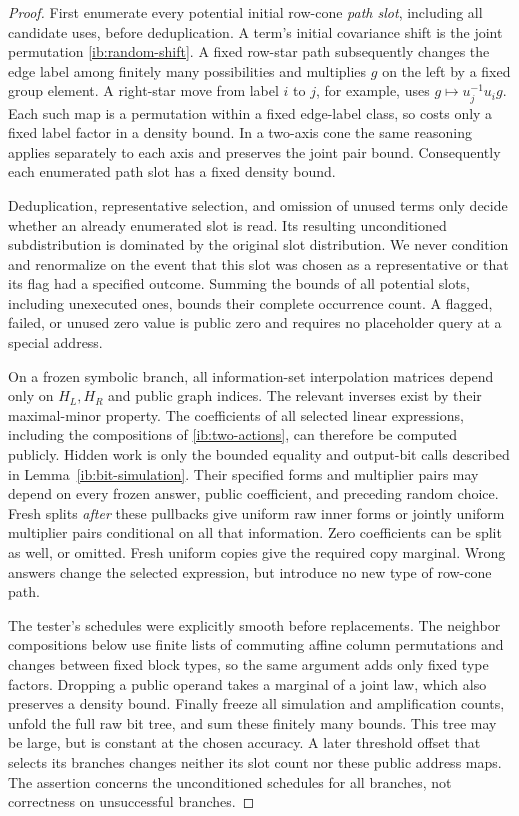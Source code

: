 \begin{proof}
First enumerate every potential initial row-cone \emph{path slot},
including all candidate uses, before deduplication.  A term's
initial covariance shift is the joint permutation
\eqref{ib:random-shift}.  A fixed row-star path subsequently changes
the edge label among finitely many possibilities and multiplies
\(g\) on the left by a fixed group element.  A right-star move
from label \(i\) to \(j\), for example, uses
\(g\mapsto u_j^{-1}u_i g\).  Each such map is a permutation
within a fixed edge-label class, so costs only a fixed label factor
in a density bound.  In a two-axis cone the same reasoning applies
separately to each axis and preserves the joint pair bound.
Consequently each enumerated path slot has a fixed density bound.

Deduplication, representative selection, and omission of unused
terms only decide whether an already enumerated slot is read.
Its resulting unconditioned subdistribution is dominated by the
original slot distribution.  We never condition and renormalize
on the event that this slot was chosen as a representative or that
its flag had a specified outcome.  Summing the bounds of all
potential slots, including unexecuted ones, bounds their complete
occurrence count.  A flagged, failed, or unused zero value is public
zero and requires no placeholder query at a special address.

On a frozen symbolic branch, all information-set interpolation
matrices depend only on \(H_L,H_R\) and public graph indices.
The relevant inverses exist by their maximal-minor property.
The coefficients of all selected linear expressions, including
the compositions of \eqref{ib:two-actions}, can therefore be
computed publicly.  Hidden work is only the bounded equality and
output-bit calls described in Lemma~\ref{ib:bit-simulation}.
Their specified forms and multiplier pairs may depend on every
frozen answer, public coefficient, and preceding random choice.
Fresh splits \emph{after} these pullbacks give uniform raw inner
forms or jointly uniform multiplier pairs conditional on all that
information.  Zero coefficients can be split as well, or omitted.
Fresh uniform copies give the required copy marginal.  Wrong
answers change the selected expression, but introduce no new type
of row-cone path.

The tester's schedules were explicitly smooth before replacements.
The neighbor compositions below use finite lists of commuting
affine column permutations and changes between fixed block types,
so the same argument adds only fixed type factors.  Dropping a
public operand takes a marginal of a joint law, which also
preserves a density bound.  Finally freeze all simulation and
amplification counts, unfold the full raw bit tree, and sum these
finitely many bounds.  This tree may be large, but is constant at
the chosen accuracy.  A later threshold offset that selects its
branches changes neither its slot count nor these public address
maps.  The assertion concerns the unconditioned schedules for
all branches, not correctness on unsuccessful branches.
\end{proof}

